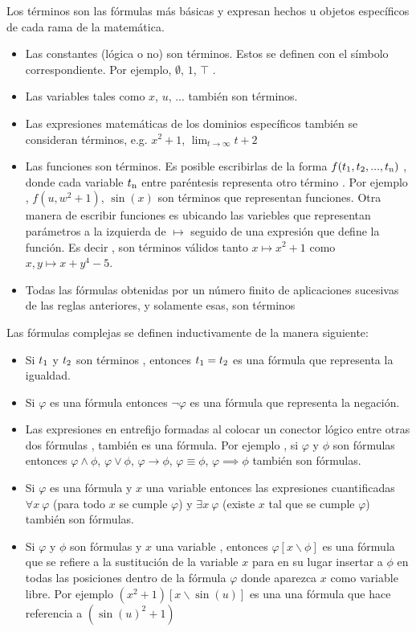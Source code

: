 Los términos son las fórmulas más básicas y expresan hechos u objetos específicos de cada rama de la matemática.

\begin{itemize}
	\item{Las constantes (lógica o no) son términos. Estos se definen con el símbolo correspondiente.  Por ejemplo, $\emptyset$, $1$, $\top$ .}
	\item{Las variables tales como $x$, $u$, ... también son términos.}
	\item{Las expresiones matemáticas de los dominios específicos también se consideran términos, e.g. $x^2 + 1$, $\lim_{t \to \infty}{t+2}$}
	\item{Las funciones son términos. Es posible escribirlas de la forma $f(t\textsubscript{1}, t\textsubscript{2}, ..., t\textsubscript{n})$ , donde cada variable $t\textsubscript{n}$ entre paréntesis representa otro término . Por ejemplo , $f(u,w^2+1)$, $\sin(x)$ son términos que representan funciones. Otra manera de escribir funciones es ubicando las variebles que representan parámetros a la izquierda de $\mapsto$ seguido de una expresión que define la función. Es decir , son términos válidos tanto $x \mapsto x^2+1$ como $x, y \mapsto x+y^4-5$.}
	\item{Todas las fórmulas  obtenidas por un número finito de aplicaciones sucesivas de las reglas anteriores, y solamente esas, son términos}
\end{itemize}

Las fórmulas complejas se definen inductivamente de la manera siguiente:

\begin{itemize}
	\item{Si $t\textsubscript{1}$ y $t\textsubscript{2}$ son términos , entonces $t\textsubscript{1}=t\textsubscript{2}$ es una fórmula que representa la igualdad.}
	\item{Si $\varphi$ es una fórmula entonces $\neg\varphi$ es una fórmula que representa la negación.}
	\item{Las expresiones en entrefijo formadas al colocar un conector lógico  entre otras dos fórmulas , también es una fórmula. Por ejemplo , si $\varphi$ y $\phi$ son fórmulas entonces $\varphi \land \phi$, $\varphi \lor \phi$, $\varphi \to \phi$, $\varphi \equiv \phi$, $\varphi \implies \phi$ también son fórmulas.}
	\item{Si $\varphi$ es una fórmula y $x$ una variable entonces las expresiones cuantificadas $\forall x\ \varphi$ (para todo $x$ se cumple $\varphi$) y $\exists x\ \varphi$ (existe $x$ tal que se cumple $\varphi$) también son fórmulas.}
	\item{Si $\varphi$ y $\phi$ son fórmulas y $x$ una variable , entonces $\varphi\left[x \backslash \phi\right]$ es una fórmula que se refiere a la sustitución de la variable $x$ para en su lugar insertar a $\phi$ en todas las posiciones dentro de la fórmula $\varphi$ donde aparezca $x$ como variable libre. Por ejemplo $(x^2+1)[x \backslash \sin(u)]$ es una una fórmula que hace referencia a $(\sin(u)^2+1)$}
\end{itemize}

